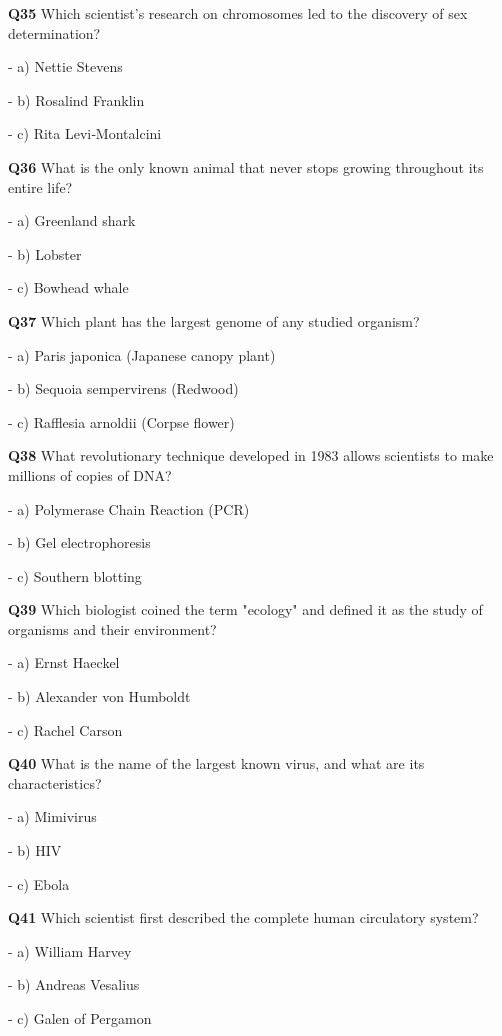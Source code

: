 \textbf{Q35} Which scientist's research on chromosomes led to the discovery of sex determination?\par
\quad - a) Nettie Stevens\par
\quad - b) Rosalind Franklin\par
\quad - c) Rita Levi‑Montalcini\par

\textbf{Q36} What is the only known animal that never stops growing throughout its entire life?\par
\quad - a) Greenland shark\par
\quad - b) Lobster\par
\quad - c) Bowhead whale\par

\textbf{Q37} Which plant has the largest genome of any studied organism?\par
\quad - a) Paris japonica (Japanese canopy plant)\par
\quad - b) Sequoia sempervirens (Redwood)\par
\quad - c) Rafflesia arnoldii (Corpse flower)\par

\textbf{Q38} What revolutionary technique developed in 1983 allows scientists to make millions of copies of DNA?\par
\quad - a) Polymerase Chain Reaction (PCR)\par
\quad - b) Gel electrophoresis\par
\quad - c) Southern blotting\par

\textbf{Q39} Which biologist coined the term "ecology" and defined it as the study of organisms and their environment?\par
\quad - a) Ernst Haeckel\par
\quad - b) Alexander von Humboldt\par
\quad - c) Rachel Carson\par

\textbf{Q40} What is the name of the largest known virus, and what are its characteristics?\par
\quad - a) Mimivirus\par
\quad - b) HIV\par
\quad - c) Ebola\par

\textbf{Q41} Which scientist first described the complete human circulatory system?\par
\quad - a) William Harvey\par
\quad - b) Andreas Vesalius\par
\quad - c) Galen of Pergamon\par

